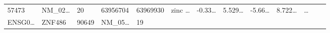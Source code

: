 \documentclass[
]{article}
\begin{document}
\begin{longtable}[]{@{}lllllllllllll@{}}
\begin{minipage}[t]{0.05\columnwidth}
57473\strut
\end{minipage} & \begin{minipage}[t]{0.05\columnwidth}\raggedright
NM\_02\ldots{}\strut
\end{minipage} & \begin{minipage}[t]{0.05\columnwidth}\raggedright
20\strut
\end{minipage} & \begin{minipage}[t]{0.05\columnwidth}\raggedright
63956704\strut
\end{minipage} & \begin{minipage}[t]{0.05\columnwidth}\raggedright
63969930\strut
\end{minipage} & \begin{minipage}[t]{0.05\columnwidth}\raggedright
zinc \ldots{}\strut
\end{minipage} & \begin{minipage}[t]{0.05\columnwidth}\raggedright
-0.33\ldots{}\strut
\end{minipage} & \begin{minipage}[t]{0.05\columnwidth}\raggedright
5.529\ldots{}\strut
\end{minipage} & \begin{minipage}[t]{0.05\columnwidth}\raggedright
-5.66\ldots{}\strut
\end{minipage} & \begin{minipage}[t]{0.05\columnwidth}\raggedright
8.722\ldots{}\strut
\end{minipage} & \begin{minipage}[t]{0.02\columnwidth}\raggedright
\ldots{}\strut
\end{minipage}\tabularnewline
\begin{minipage}[t]{0.05\columnwidth}\raggedright
ENSG0\ldots{}\strut
\end{minipage} & \begin{minipage}[t]{0.05\columnwidth}\raggedright
ZNF486\strut
\end{minipage} & \begin{minipage}[t]{0.05\columnwidth}\raggedright
90649\strut
\end{minipage} & \begin{minipage}[t]{0.05\columnwidth}\raggedright
NM\_05\ldots{}\strut
\end{minipage} & \begin{minipage}[t]{0.05\columnwidth}\raggedright
19\strut
\end{minipage} & \begin{minipage}[t]{0.05\columnwidth}\raggedright

\end{minipage}
\end{longtable}
\end{document}
